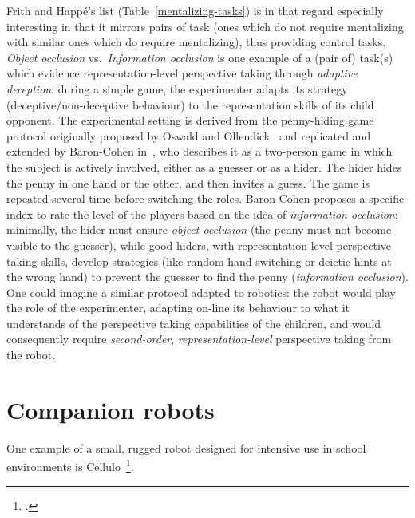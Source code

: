 \documentclass[11pt]{report}
\begin{document}
Frith and Happé's list (Table~\ref{mentalizing-tasks}) is in that regard
especially interesting in that it mirrors pairs of task (ones which do not
require mentalizing with similar ones which do require mentalizing), thus
providing control tasks.  \emph{Object occlusion} vs.~\emph{Information
occlusion} is one example of a (pair of) task(s) which evidence
representation-level perspective taking through \emph{adaptive deception}:
during a simple game, the experimenter adapts its strategy
(deceptive/non-deceptive behaviour) to the representation skills of its child
opponent. The experimental setting is derived from the penny-hiding game
protocol originally proposed by Oswald and Ollendick~\cite{oswald1989role} and
replicated and extended by Baron-Cohen in~\cite{baron1992out}, who describes it
as a two-person game in which the subject is actively involved, either as a
guesser or as a hider. The hider hides the penny in one hand or the other, and
then invites a guess. The game is repeated several time before switching the
roles. Baron-Cohen proposes a specific index to rate the level of the players
based on the idea of \emph{information occlusion}: minimally, the hider must
ensure \emph{object occlusion} (the penny must not become visible to the
guesser), while good hiders, with representation-level perspective taking
skills, develop strategies (like random hand switching or deictic hints at the
wrong hand) to prevent the guesser to find the penny (\emph{information
occlusion}). One could imagine a similar protocol adapted to robotics: the robot
would play the role of the experimenter, adapting on-line its
behaviour to what it understands of the perspective taking capabilities of the
children, and would consequently require \emph{second-order},
\emph{representation-level} perspective taking from the robot.




\section{Companion robots}

One example of a small, rugged robot designed for intensive use in school
environments is Cellulo~\footcite{ozgur2017cellulo}.
\end{document}
